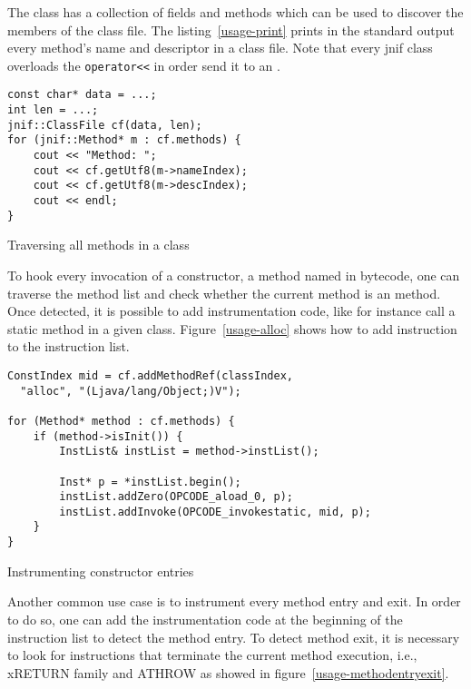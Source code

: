 The  class has a collection of fields and methods which can be used to discover the members of the class file. 
The listing~\ref{usage-print} prints in the standard output every method's name and descriptor in a class file. 
Note that every jnif class overloads the \verb|operator<<| in order send it to an .

\begin{listing}
\begin{verbatim}
const char* data = ...;
int len = ...;
jnif::ClassFile cf(data, len);
for (jnif::Method* m : cf.methods) {
	cout << "Method: ";
	cout << cf.getUtf8(m->nameIndex);
	cout << cf.getUtf8(m->descIndex);
	cout << endl;
}
\end{verbatim}
\caption{Traversing all methods in a class}
\label{usage-print}
\end{listing}

To hook every invocation of a constructor, a method named  in \java{} bytecode, 
one can traverse the method list and check whether the current method is an  method. 
Once detected, it is possible to add instrumentation code, like for instance call a static method in a given class. 
Figure~\ref{usage-alloc} shows how to add instruction to the instruction list.

\begin{listing}
\begin{verbatim}
ConstIndex mid = cf.addMethodRef(classIndex, 
  "alloc", "(Ljava/lang/Object;)V");

for (Method* method : cf.methods) {
	if (method->isInit()) {
		InstList& instList = method->instList();

		Inst* p = *instList.begin();
		instList.addZero(OPCODE_aload_0, p);
		instList.addInvoke(OPCODE_invokestatic, mid, p);
	}
}
\end{verbatim}
\caption{Instrumenting constructor entries}
\label{usage-alloc}
\end{listing}

Another common use case is to instrument every method entry and exit. In order to do so, one can add the instrumentation code at the beginning of the instruction list to detect the method entry. To detect method exit, it is necessary to look for instructions that terminate the current method execution, i.e., xRETURN family and ATHROW as showed in figure~\ref{usage-methodentryexit}.

